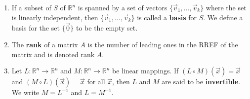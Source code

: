 \documentclass[10pt,english]{article}
\begin{document}
\begin{enumerate}
\item If a subset of $S$ of $\mathbb{R}^n$ is spanned by a set of vectors $\{\vec{v}_1,\ldots,\vec{v}_k\}$ where the set is linearly independent, then $\{\vec{v}_1,\ldots,\vec{v}_k\}$ is called a \textbf{basis} for $S$. We define a basis for the set $\{\vec{0}\}$ to be the empty set.\pagebreak
\item The \textbf{rank} of a matrix $A$ is the number of leading ones in the RREF of the matrix and is denoted rank $A$.\pagebreak
\item Let $L:\mathbb{R}^n\rightarrow\mathbb{R}^n$ and $M:\mathbb{R}^n\rightarrow\mathbb{R}^n$ be linear mappings. If $(L\circ M)(\vec{x})=\vec{x}$ and $(M\circ L)(\vec{x})=\vec{x}$ for all $\vec{x}$, then $L$ and $M$ are said to be \textbf{invertible}. We write $M=L^{-1}$ and $L=M^{-1}$.
\end{enumerate}
\end{document}
